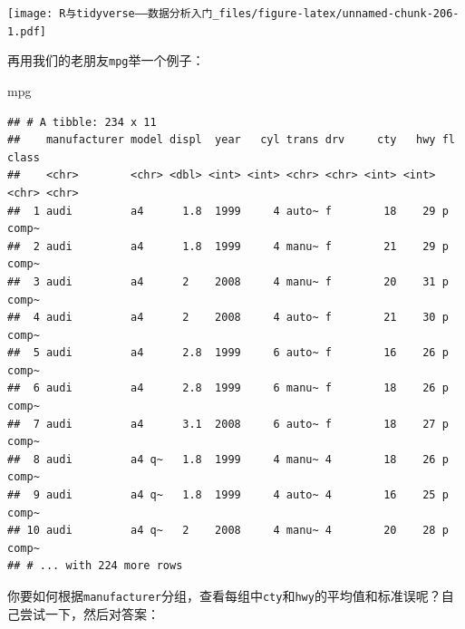 \documentclass[]{book}
\newenvironment{Shaded}{\begin{snugshade}}{\end{snugshade}}
\newcommand{\DataTypeTok}[1]{\textcolor[rgb]{0.13,0.29,0.53}{#1}}
\newcommand{\KeywordTok}[1]{\textcolor[rgb]{0.13,0.29,0.53}{\textbf{#1}}}
\newcommand{\NormalTok}[1]{#1}
\newcommand{\OperatorTok}[1]{\textcolor[rgb]{0.81,0.36,0.00}{\textbf{#1}}}
\newcommand{\StringTok}[1]{\textcolor[rgb]{0.31,0.60,0.02}{#1}}
\begin{document}
\texttt{[image: R与tidyverse——数据分析入门\_files/figure-latex/unnamed-chunk-206-1.pdf]}

再用我们的老朋友\texttt{mpg}举一个例子：

\begin{Shaded}
\begin{Highlighting}[]
\NormalTok{mpg}
\end{Highlighting}
\end{Shaded}

\begin{verbatim}
## # A tibble: 234 x 11
##    manufacturer model displ  year   cyl trans drv     cty   hwy fl    class
##    <chr>        <chr> <dbl> <int> <int> <chr> <chr> <int> <int> <chr> <chr>
##  1 audi         a4      1.8  1999     4 auto~ f        18    29 p     comp~
##  2 audi         a4      1.8  1999     4 manu~ f        21    29 p     comp~
##  3 audi         a4      2    2008     4 manu~ f        20    31 p     comp~
##  4 audi         a4      2    2008     4 auto~ f        21    30 p     comp~
##  5 audi         a4      2.8  1999     6 auto~ f        16    26 p     comp~
##  6 audi         a4      2.8  1999     6 manu~ f        18    26 p     comp~
##  7 audi         a4      3.1  2008     6 auto~ f        18    27 p     comp~
##  8 audi         a4 q~   1.8  1999     4 manu~ 4        18    26 p     comp~
##  9 audi         a4 q~   1.8  1999     4 auto~ 4        16    25 p     comp~
## 10 audi         a4 q~   2    2008     4 manu~ 4        20    28 p     comp~
## # ... with 224 more rows
\end{verbatim}

你要如何根据\texttt{manufacturer}分组，查看每组中\texttt{cty}和\texttt{hwy}的平均值和标准误呢？自己尝试一下，然后对答案：

\begin{Shaded}
\end{Shaded}
\end{document}
